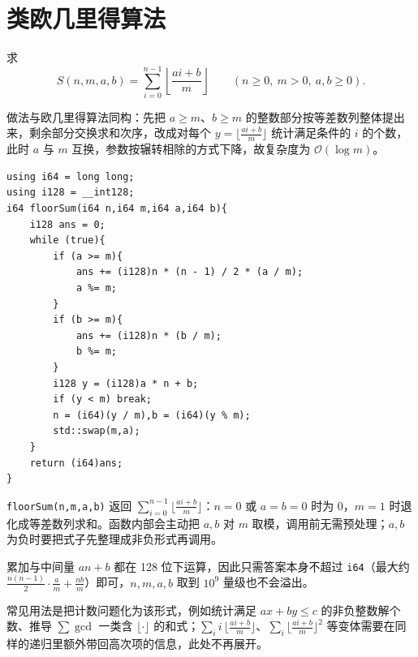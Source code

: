 \section{类欧几里得算法}

求
$$S(n,m,a,b)=\sum_{i=0}^{n-1}\left\lfloor\frac{ai+b}{m}\right\rfloor\qquad(n\ge0,\ m>0,\ a,b\ge0).$$

做法与欧几里得算法同构：先把 $a\ge m$、$b\ge m$ 的整数部分按等差数列整体提出来，剩余部分交换求和次序，改成对每个 $y=\lfloor\frac{ai+b}{m}\rfloor$ 统计满足条件的 $i$ 的个数，此时 $a$ 与 $m$ 互换，参数按辗转相除的方式下降，故复杂度为 $\mathcal{O}(\log m)$。

\begin{lstlisting}
using i64 = long long;
using i128 = __int128;
i64 floorSum(i64 n,i64 m,i64 a,i64 b){
    i128 ans = 0;
    while (true){
        if (a >= m){
            ans += (i128)n * (n - 1) / 2 * (a / m);
            a %= m;
        }
        if (b >= m){
            ans += (i128)n * (b / m);
            b %= m;
        }
        i128 y = (i128)a * n + b;
        if (y < m) break;
        n = (i64)(y / m),b = (i64)(y % m);
        std::swap(m,a);
    }
    return (i64)ans;
}
\end{lstlisting}

\texttt{floorSum(n,m,a,b)} 返回 $\sum_{i=0}^{n-1}\lfloor\frac{ai+b}{m}\rfloor$：$n=0$ 或 $a=b=0$ 时为 $0$，$m=1$ 时退化成等差数列求和。函数内部会主动把 $a,b$ 对 $m$ 取模，调用前无需预处理；$a,b$ 为负时要把式子先整理成非负形式再调用。

累加与中间量 $an+b$ 都在 128 位下运算，因此只需答案本身不超过 \texttt{i64}（最大约 $\frac{n(n-1)}2\cdot\frac am+\frac{nb}m$）即可，$n,m,a,b$ 取到 $10^9$ 量级也不会溢出。

常见用法是把计数问题化为该形式，例如统计满足 $ax+by\le c$ 的非负整数解个数、推导 $\sum\gcd$ 一类含 $\lfloor\cdot\rfloor$ 的和式；$\sum_i i\,\lfloor\frac{ai+b}{m}\rfloor$、$\sum_i\lfloor\frac{ai+b}{m}\rfloor^2$ 等变体需要在同样的递归里额外带回高次项的信息，此处不再展开。
